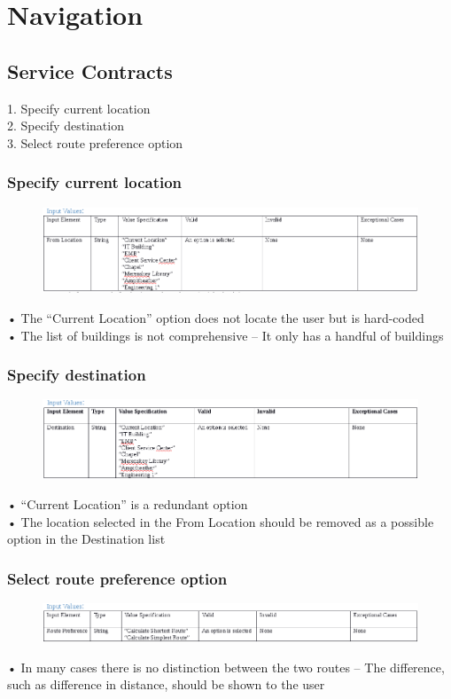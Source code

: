 \documentclass[english]{article}
\begin{document}
\section{Navigation}
\subsection{Service Contracts}
1.	Specify current location\\
2.	Specify destination\\
3.	Select route preference option\\
\subsubsection{Specify current location}
\begin{figure}[ht!]
\hspace*{-2.5cm}
\includegraphics[width=180mm]{Nav1.png}
\end{figure}
•	The “Current Location” option does not locate the user but is hard-coded\\
•	The list of buildings is not comprehensive – It only has a handful of buildings\\
\subsubsection{Specify destination}
\begin{figure}[ht!]
\hspace*{-2.5cm}
\includegraphics[width=180mm]{Nav2.png}
\end{figure}
•	“Current Location” is a redundant option\\
•	The location selected in the From Location should be removed as a possible option in the Destination list\\
\subsubsection{Select route preference option}
\begin{figure}[ht!]
\hspace*{-2.5cm}
\includegraphics[width=180mm]{Nav3.png}
\end{figure}
•	In many cases there is no distinction between the two routes – The difference, such as difference in distance, should be shown to the user\\
\end{document}
